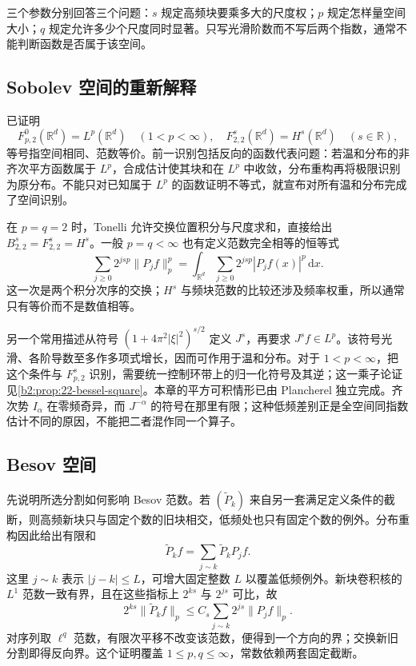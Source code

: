 \ProseParagraphBreak

三个参数分别回答三个问题：\(s\) 规定高频块要乘多大的尺度权；\(p\) 规定怎样量空间大小；\(q\) 规定允许多少个尺度同时显著。只写光滑阶数而不写后两个指数，通常不能判断函数是否属于该空间。

\subsection{Sobolev 空间的重新解释}
\label{b2:subsec:190502}

已证明
\[
 F^0_{p,2}(\mathbb R^d)=L^p(\mathbb R^d)
 \quad(1<p<\infty),
 \quad F^s_{2,2}(\mathbb R^d)=H^s(\mathbb R^d)
 \quad(s\in\mathbb R),
\]
等号指空间相同、范数等价。前一识别包括反向的函数代表问题：若温和分布的非齐次平方函数属于 \(L^p\)，合成估计使其块和在 \(L^p\) 中收敛，分布重构再将极限识别为原分布。不能只对已知属于 \(L^p\) 的函数证明不等式，就宣布对所有温和分布完成了空间识别。

\ProseParagraphBreak

在 \(p=q=2\) 时，Tonelli 允许交换位置积分与尺度求和，直接给出 \(B^s_{2,2}=F^s_{2,2}=H^s\)。一般 \(p=q<\infty\) 也有定义范数完全相等的恒等式
\[
 \sum_{j\geq0}2^{jsp}\|P_jf\|_p^p
 =\int_{\mathbb R^d}\sum_{j\geq0}2^{jsp}|P_jf(x)|^p\,\mathrm dx.
\]
这一次是两个积分次序的交换；\(H^s\) 与频块范数的比较还涉及频率权重，所以通常只有等价而不是数值相等。

\ProseParagraphBreak

另一个常用描述从符号 \((1+4\pi^2|\xi|^2)^{s/2}\) 定义 \(J^s\)，再要求 \(J^sf\in L^p\)。该符号光滑、各阶导数至多作多项式增长，因而可作用于温和分布。对于 \(1<p<\infty\)，把这个条件与 \(F^s_{p,2}\) 识别，需要统一控制环带上的归一化符号及其逆；这一乘子论证见\cref{b2:prop:22-bessel-square}。本章的平方可积情形已由 Plancherel 独立完成。齐次势 \(I_\alpha\) 在零频奇异，而 \(J^{-\alpha}\) 的符号在那里有限；这种低频差别正是全空间同指数估计不同的原因，不能把二者混作同一个算子。

\subsection{Besov 空间}
\label{b2:subsec:190503}

先说明所选分割如何影响 Besov 范数。若 \((\widetilde P_k)\) 来自另一套满足定义条件的截断，则高频新块只与固定个数的旧块相交，低频处也只有固定个数的例外。分布重构因此给出有限和
\[
 \widetilde P_kf=\sum_{j\sim k}\widetilde P_kP_jf.
\]
这里 \(j\sim k\) 表示 \(|j-k|\leq L\)，可增大固定整数 \(L\) 以覆盖低频例外。新块卷积核的 \(L^1\) 范数一致有界，且在这些指标上 \(2^{ks}\) 与 \(2^{js}\) 可比，故
\[
 2^{ks}\|\widetilde P_kf\|_p
 \leq C_s\sum_{j\sim k}2^{js}\|P_jf\|_p.
\]
对序列取 \(\ell^q\) 范数，有限次平移不改变该范数，便得到一个方向的界；交换新旧分割即得反向界。这个证明覆盖 \(1\leq p,q\leq\infty\)，常数依赖两套固定截断。

